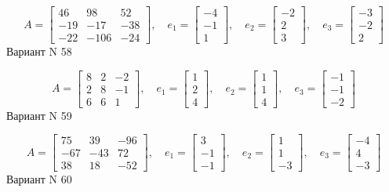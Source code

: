 \documentclass[11pt]{report}
\begin{document}
$$A = \left[\begin{matrix}46 & 98 & 52\\-19 & -17 & -38\\-22 & -106 & -24\end{matrix}\right],\quad e_1 = \left[\begin{matrix}-4\\-1\\1\end{matrix}\right],\quad e_2 = \left[\begin{matrix}-2\\2\\3\end{matrix}\right],\quad e_3 = \left[\begin{matrix}-3\\-2\\2\end{matrix}\right]$$Вариант N 58

$$A = \left[\begin{matrix}8 & 2 & -2\\2 & 8 & -1\\6 & 6 & 1\end{matrix}\right],\quad e_1 = \left[\begin{matrix}1\\2\\4\end{matrix}\right],\quad e_2 = \left[\begin{matrix}1\\1\\4\end{matrix}\right],\quad e_3 = \left[\begin{matrix}-1\\-1\\-2\end{matrix}\right]$$Вариант N 59

$$A = \left[\begin{matrix}75 & 39 & -96\\-67 & -43 & 72\\38 & 18 & -52\end{matrix}\right],\quad e_1 = \left[\begin{matrix}3\\-1\\-1\end{matrix}\right],\quad e_2 = \left[\begin{matrix}1\\1\\-3\end{matrix}\right],\quad e_3 = \left[\begin{matrix}-4\\4\\-3\end{matrix}\right]$$Вариант N 60
\end{document}
